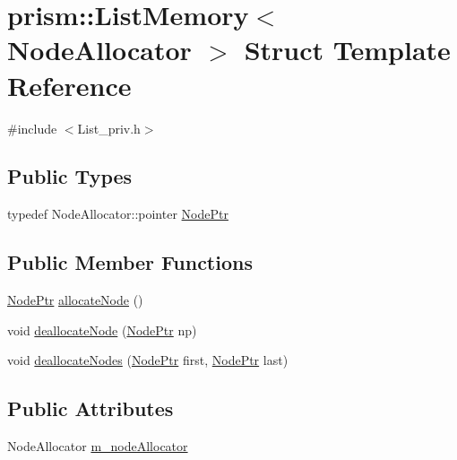 \hypertarget{structprism_1_1_list_memory}{}\section{prism\+:\+:List\+Memory$<$ Node\+Allocator $>$ Struct Template Reference}
\label{structprism_1_1_list_memory}


{\ttfamily \#include $<$List\+\_\+priv.\+h$>$}

\subsection*{Public Types}
\begin{DoxyCompactItemize}
\item 
typedef Node\+Allocator\+::pointer \hyperlink{structprism_1_1_list_memory_a9e7b9eaaf60c96090da1d52221a944f1}{Node\+Ptr}
\end{DoxyCompactItemize}
\subsection*{Public Member Functions}
\begin{DoxyCompactItemize}
\item 
\hyperlink{structprism_1_1_list_memory_a9e7b9eaaf60c96090da1d52221a944f1}{Node\+Ptr} \hyperlink{structprism_1_1_list_memory_a3becac9851123f78b06efeaf25cb09f1}{allocate\+Node} ()
\item 
void \hyperlink{structprism_1_1_list_memory_afc9d0b7ac9c4a7af6c0430780c0cf02c}{deallocate\+Node} (\hyperlink{structprism_1_1_list_memory_a9e7b9eaaf60c96090da1d52221a944f1}{Node\+Ptr} np)
\item 
void \hyperlink{structprism_1_1_list_memory_aff3dc132e9cb4f03f1a16fde5a3b5534}{deallocate\+Nodes} (\hyperlink{structprism_1_1_list_memory_a9e7b9eaaf60c96090da1d52221a944f1}{Node\+Ptr} first, \hyperlink{structprism_1_1_list_memory_a9e7b9eaaf60c96090da1d52221a944f1}{Node\+Ptr} last)
\end{DoxyCompactItemize}
\subsection*{Public Attributes}
\begin{DoxyCompactItemize}
\item 
Node\+Allocator \hyperlink{structprism_1_1_list_memory_a6e7929b4c99750b7f05c23f917ce03fe}{m\+\_\+node\+Allocator}
\end{DoxyCompactItemize}



